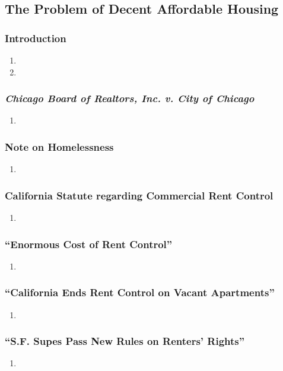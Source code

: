 \subsection{The Problem of Decent Affordable Housing}

\subsubsection{Introduction}

\begin{enumerate}
    \item %
    \item %
\end{enumerate}

\subsubsection{\emph{Chicago Board of Realtors, Inc. v. City of Chicago}}

\begin{enumerate}
    \item %
\end{enumerate}

\subsubsection{Note on Homelessness}

\begin{enumerate}
    \item %
\end{enumerate}

\subsubsection{California Statute regarding Commercial Rent Control}

\begin{enumerate}
    \item %
\end{enumerate}

\subsubsection{``Enormous Cost of Rent Control''}

\begin{enumerate}
    \item %
\end{enumerate}

\subsubsection{``California Ends Rent Control on Vacant Apartments''}

\begin{enumerate}
    \item %
\end{enumerate}

\subsubsection{``S.F. Supes Pass New Rules on Renters' Rights''}

\begin{enumerate}
    \item %
\end{enumerate}

